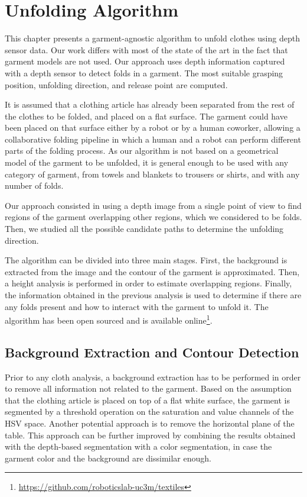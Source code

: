 \chapter{Unfolding Algorithm}
\label{architecture}

This chapter presents a garment-agnostic algorithm to unfold clothes using depth sensor data. Our work differs with most of the state of the art in the fact that garment models are not used. Our approach uses depth information captured with a depth sensor to detect folds in a garment. The most suitable grasping position, unfolding direction, and release point are computed.

It is assumed that a clothing article has already been separated from the rest of the clothes to be folded, and placed on a flat surface. The garment could have been placed on that surface either by a robot or by a human coworker, allowing a collaborative folding pipeline in which a human and a robot can perform different parts of the folding process.
As our algorithm is not based on a geometrical model of the garment to be unfolded, it is general enough to be used with any category of garment, from towels and blankets to trousers or shirts, and with any number of folds. 

Our approach consisted in using a depth image from a single point of view to find regions of the garment overlapping other regions, which we considered to be folds. Then, we studied all the possible candidate paths to determine the unfolding direction. 

The algorithm can be divided into three main stages. First, the background is extracted from the image and the contour of the garment is approximated. Then, a height analysis is performed in order to estimate overlapping regions. Finally, the information obtained in the previous analysis is used to determine if there are any folds present and how to interact with the garment to unfold it. The algorithm has been open sourced and is available online\footnote{\url{https://github.com/roboticslab-uc3m/textiles}}.

\section{Background Extraction and Contour Detection}
Prior to any cloth analysis, a background extraction has to be performed in order to remove all information not related to the garment.
Based on the assumption that the clothing article is placed on top of a flat white surface, the garment is segmented by a threshold operation on the saturation and value channels of the HSV space. Another potential approach is to remove the horizontal plane of the table. This approach can be further improved by combining the results obtained with the depth-based segmentation with a color segmentation, in case the garment color and the background are dissimilar enough.

